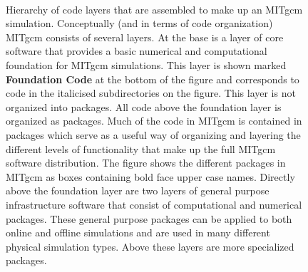\begin{figure}
\\
\caption{ Hierarchy of code layers that are assembled to make up an MITgcm 
simulation. Conceptually (and in terms of code organization) MITgcm consists
of several layers. At the base is a layer of core software that provides a 
basic numerical and computational foundation for MITgcm simulations. This 
layer is shown marked {\bf Foundation Code} at the bottom of the figure
and corresponds to code in the italicised subdirectories on the figure.
This layer is not organized into packages. All code above the foundation layer
is organized as packages.  Much of the code in MITgcm is contained in packages 
which serve as a useful way of organizing and layering the different levels of 
functionality that make up the full MITgcm software distribution.
The figure shows the different packages in MITgcm as boxes containing bold 
face upper case names.  Directly above the foundation layer are two layers of 
general purpose infrastructure software that consist of computational and 
numerical packages.  These general purpose packages can be applied to both 
online and offline simulations and are used in many different physical 
simulation types.  Above these layers are more specialized packages.  }
\label{fig:package_organigramme}
\end{figure}

